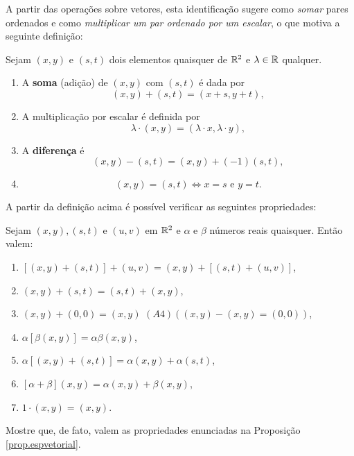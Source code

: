 A partir das operações sobre vetores, esta identificação sugere como \textit{somar} pares ordenados e como \textit{multiplicar um par ordenado por um escalar}, o que motiva a seguinte definição:
    \begin{definition}
        Sejam \((x,y)\) e \((s,t)\) dois elementos quaisquer de \(\mathbb{R}^2\) e \(\lambda\in\mathbb{R}\) qualquer.
            \begin{enumerate}
                \item A \textbf{soma} (adição) de \((x,y)\) com \((s,t)\) é dada por \[(x,y) + (s,t) = (x+s,y+t),\]
                \item A multiplicação por escalar é definida por \[\lambda \cdot (x,y) = (\lambda\cdot x,\lambda\cdot y),\] 
                \item A \textbf{diferença} é \[(x,y) - (s,t) = (x,y) + (-1)(s,t),\]
                \item \[(x,y) = (s,t) \Leftrightarrow x=s \text{ e } y=t.\]
            \end{enumerate}
    \end{definition}

A partir da definição acima é possível verificar as seguintes propriedades:
\begin{proposition}\label{prop.espvetorial}
    Sejam \((x,y), (s,t)\) e \((u,v)\) em \(\mathbb{R}^2\) e \(\alpha\) e \(\beta\) números reais quaisquer. Então valem:
        \begin{enumerate}
            \item[(A1)] \([(x,y) + (s,t)] + (u,v) = (x,y) + [(s,t)+(u,v)]\),
            \item[(A2)] \((x,y) + (s,t) = (s,t) + (x,y)\),
            \item[(A3)] \((x,y) + (0,0) = (x,y)\) \((A4) \left( (x,y) - (x,y) = (0,0) \right)\),
            \item[(M1)] \(\alpha[\beta(x,y)] = \alpha\beta(x,y)\),
            \item[(M2)] \(\alpha[(x,y)+(s,t)] = \alpha(x,y) + \alpha(s,t)\),
            \item[(M3)] \([\alpha + \beta](x,y) = \alpha(x,y) + \beta(x,y)\),
            \item[(M4)] \(1\cdot(x,y) = (x,y)\).
        \end{enumerate}
\end{proposition}

\begin{exercise}
    Mostre que, de fato, valem as propriedades enunciadas na Proposição \ref{prop.espvetorial}.
\end{exercise}

